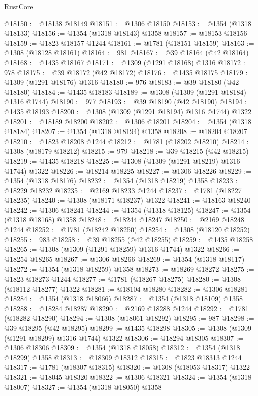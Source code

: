\begin{lexlean}{RustCore}
\begin{coremodule}
@18150 := @18138 @18149
@18151 := @1306 @18150
@18153 := @1354 (@1318 @18133)
@18156 := @1354 (@1318 @18143) @1358
@18157 := @18153 @18156
@18159 := @1823 @18157 @1244
@18161 := @1781 (@18151 @18159)
@18163 := @1308 (@18128 @18161)
@18164 := 981
@18167 := @39 @18164 (@42 @18164)
@18168 := @1435 @18167
@18171 := @1309 (@1291 @18168) @1316
@18172 := 978
@18175 := @39 @18172 (@42 @18172)
@18176 := @1435 @18175
@18179 := @1309 (@1291 @18176) @1316
@18180 := 976
@18183 := @39 @18180 (@42 @18180)
@18184 := @1435 @18183
@18189 := @1308 (@1309 (@1291 @18184) @1316 @1744)
@18190 := 977
@18193 := @39 @18190 (@42 @18190)
@18194 := @1435 @18193
@18200 := @1308 (@1309 (@1291 @18194) @1316 @1744) @1322
@18201 := @18189 @18200
@18202 := @1306 @18201
@18204 := @1354 (@1318 @18184)
@18207 := @1354 (@1318 @18194) @1358
@18208 := @18204 @18207
@18210 := @1823 @18208 @1244
@18212 := @1781 (@18202 @18210)
@18214 := @1308 (@18179 @18212)
@18215 := 979
@18218 := @39 @18215 (@42 @18215)
@18219 := @1435 @18218
@18225 := @1308 (@1309 (@1291 @18219) @1316 @1744) @1322
@18226 := @18214 @18225
@18227 := @1306 @18226
@18229 := @1354 (@1318 @18176)
@18232 := @1354 (@1318 @18219) @1358
@18233 := @18229 @18232
@18235 := @2169 @18233 @1244
@18237 := @1781 (@18227 @18235)
@18240 := @1308 (@18171 @18237) @1322
@18241 := @18163 @18240
@18242 := @1306 @18241
@18244 := @1354 (@1318 @18125)
@18247 := @1354 (@1318 @18168) @1358
@18248 := @18244 @18247
@18250 := @2169 @18248 @1244
@18252 := @1781 (@18242 @18250)
@18254 := @1308 (@18120 @18252)
@18255 := 983
@18258 := @39 @18255 (@42 @18255)
@18259 := @1435 @18258
@18265 := @1308 (@1309 (@1291 @18259) @1316 @1744) @1322
@18266 := @18254 @18265
@18267 := @1306 @18266
@18269 := @1354 (@1318 @18117)
@18272 := @1354 (@1318 @18259) @1358
@18273 := @18269 @18272
@18275 := @1823 @18273 @1244
@18277 := @1781 (@18267 @18275)
@18280 := @1308 (@18112 @18277) @1322
@18281 := @18104 @18280
@18282 := @1306 @18281
@18284 := @1354 (@1318 @18066)
@18287 := @1354 (@1318 @18109) @1358
@18288 := @18284 @18287
@18290 := @2169 @18288 @1244
@18292 := @1781 (@18282 @18290)
@18294 := @1308 (@18061 @18292)
@18295 := 987
@18298 := @39 @18295 (@42 @18295)
@18299 := @1435 @18298
@18305 := @1308 (@1309 (@1291 @18299) @1316 @1744) @1322
@18306 := @18294 @18305
@18307 := @1306 @18306
@18309 := @1354 (@1318 @18058)
@18312 := @1354 (@1318 @18299) @1358
@18313 := @18309 @18312
@18315 := @1823 @18313 @1244
@18317 := @1781 (@18307 @18315)
@18320 := @1308 (@18053 @18317) @1322
@18321 := @18045 @18320
@18322 := @1306 @18321
@18324 := @1354 (@1318 @18007)
@18327 := @1354 (@1318 @18050) @1358

\end{coremodule}
\end{lexlean}
